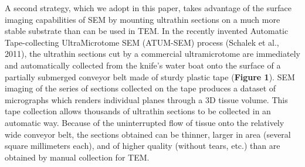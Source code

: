 \documentclass{article}
\begin{document}
A second strategy, which we adopt in this paper, takes advantage of the surface imaging capabilities of SEM by mounting ultrathin sections on a much more stable substrate than can be used in TEM. In the recently invented Automatic Tape-collecting UltraMicrotome SEM (ATUM-SEM) process (Schalek et al., 2011), the ultrathin sections cut by a commercial ultramicrotome are immediately and automatically collected from the knife’s water boat onto the surface of a partially submerged conveyor belt made of sturdy plastic tape (\textbf{Figure 1}). SEM imaging of the series of sections collected on the tape produces a dataset of micrographs which renders individual planes through a 3D tissue volume. This tape collection allows thousands of ultrathin sections to be collected in an automatic way. Because of the uninterrupted flow of tissue onto the relatively wide conveyor belt, the sections obtained can be thinner, larger in area (several square millimeters each), and of higher quality (without tears, etc.) than are obtained by manual collection for TEM.
\end{document}

